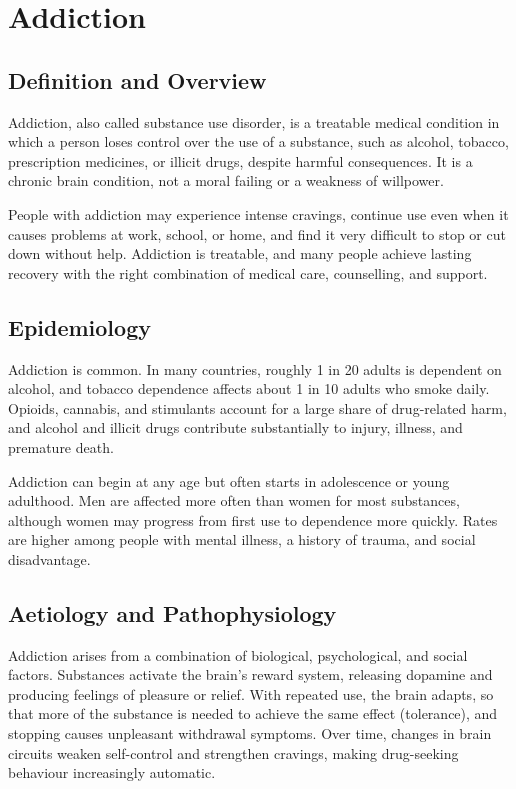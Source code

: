 \chapter{Addiction}

\section*{Definition and Overview}
Addiction, also called substance use disorder, is a treatable medical condition in which a person loses control over the use of a substance, such as alcohol, tobacco, prescription medicines, or illicit drugs, despite harmful consequences. It is a chronic brain condition, not a moral failing or a weakness of willpower.

People with addiction may experience intense cravings, continue use even when it causes problems at work, school, or home, and find it very difficult to stop or cut down without help. Addiction is treatable, and many people achieve lasting recovery with the right combination of medical care, counselling, and support.

\section*{Epidemiology}
Addiction is common. In many countries, roughly 1 in 20 adults is dependent on alcohol, and tobacco dependence affects about 1 in 10 adults who smoke daily. Opioids, cannabis, and stimulants account for a large share of drug-related harm, and alcohol and illicit drugs contribute substantially to injury, illness, and premature death.

Addiction can begin at any age but often starts in adolescence or young adulthood. Men are affected more often than women for most substances, although women may progress from first use to dependence more quickly. Rates are higher among people with mental illness, a history of trauma, and social disadvantage.

\section*{Aetiology and Pathophysiology}
Addiction arises from a combination of biological, psychological, and social factors. Substances activate the brain's reward system, releasing dopamine and producing feelings of pleasure or relief. With repeated use, the brain adapts, so that more of the substance is needed to achieve the same effect (tolerance), and stopping causes unpleasant withdrawal symptoms. Over time, changes in brain circuits weaken self-control and strengthen cravings, making drug-seeking behaviour increasingly automatic.

